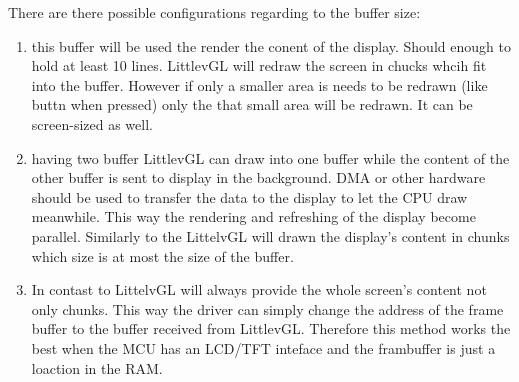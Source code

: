 \documentclass[letterpaper,10pt,english]{sphinxmanual}
\begin{document}
%
\begin{sphinxVerbatim}[commandchars=\\\{\}]
                          
    
      \PYG{p}{[}  \PYG{p}{]}
      \PYG{p}{[}  \PYG{p}{]}
    
       
\end{sphinxVerbatim}

There are there possible configurations regarding to the buffer size:
\begin{enumerate}
\item {} 
 this buffer will be used the render the conent of the display. Should enough to hold at least 10 lines.
LittlevGL will redraw the screen in chucks whcih fit into the buffer. However if only a smaller area is needs to be redrawn (like buttn when pressed) only the that small area will be redrawn.
It can be screen-sized as well.

\item {} 
 having two buffer LittlevGL can draw into one buffer while the content of the other buffer is sent to display in the background.
DMA or other hardware should be used to transfer the data to the display to let the CPU draw meanwhile.
This way the rendering and refreshing of the display become parallel. Similarly to the  LittelvGL will drawn the display’s content in chunks which size is at most the size of the buffer.

\item {} 
In contast to  LittelvGL will always provide the whole screen’s content not only chunks. This way the driver can simply change the address of the frame buffer to the buffer received from LittlevGL.
Therefore this method works the best when the MCU has an LCD/TFT inteface and the frambuffer is just a loaction in the RAM.

\end{enumerate}
\end{document}
